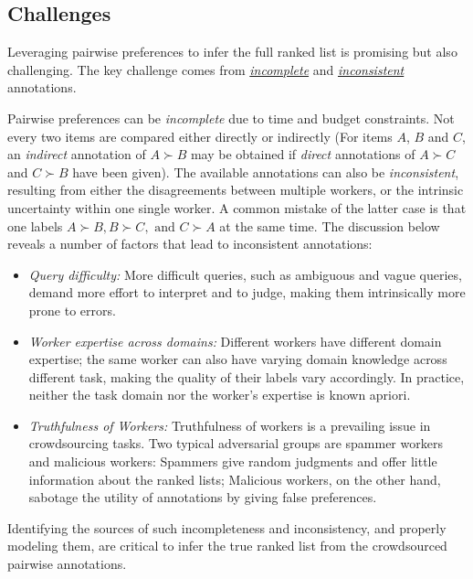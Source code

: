 \subsection{Challenges}

Leveraging pairwise preferences to infer the full ranked list is promising but
also challenging. The key challenge comes from \emph{\underline{incomplete}} and
\emph{\underline{inconsistent}} annotations.

Pairwise preferences can be \emph{incomplete} due to time and budget
constraints. Not every two items are compared either directly or indirectly (For
items $A$, $B$ and $C$, an \textit{indirect} annotation of $A \succ B$ may be
obtained if \textit{direct} annotations of $A \succ C$ and $C \succ B$ have been
given). The available annotations can also be \emph{inconsistent}, resulting
from either the disagreements between multiple workers, or the intrinsic
uncertainty within one single worker. A common mistake of the latter case is
that one labels  $A \succ B, B \succ C, \mbox{ and } C \succ A$ at the same
time. The discussion below reveals a number of factors that lead to inconsistent
annotations:

\begin{itemize}
\item \emph{Query difficulty:}  More difficult queries, such as ambiguous and
  vague queries, demand more effort to interpret and to judge, making them
  intrinsically more prone to errors.
\item  {\emph{Worker expertise across domains:}} Different workers have
  different domain expertise; the same worker can also have varying domain
  knowledge across different task, making the quality of their labels vary
  accordingly. In practice, neither the task domain nor the worker's expertise
  is known apriori.
\item {\emph{Truthfulness of Workers:}} Truthfulness of workers is a prevailing
  issue in crowdsourcing tasks. Two typical adversarial groups are spammer
  workers and malicious workers: Spammers give random judgments and offer little
  information about the ranked lists;  Malicious workers, on the other hand,
  sabotage the utility of annotations by giving false preferences.
\end{itemize}

Identifying the sources of such incompleteness and inconsistency, and properly
modeling them, are critical to infer the true ranked list from the crowdsourced
pairwise annotations.

